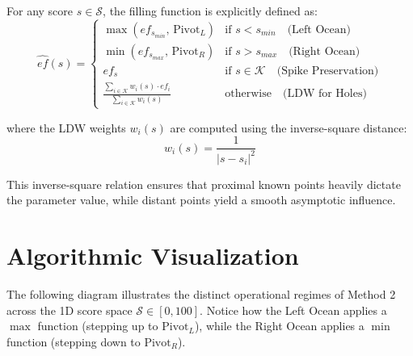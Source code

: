 \documentclass[11pt,a4paper]{article}
\begin{document}
For any score $s \in \mathcal{S}$, the filling function is explicitly defined as:
\begin{equation}
\hat{ef}(s) = 
\begin{cases} 
\max\left( ef_{s_{min}}, \, \text{Pivot}_L \right) & \text{if } s < s_{min} \quad \text{(Left Ocean)} \\[8pt]
\min\left( ef_{s_{max}}, \, \text{Pivot}_R \right) & \text{if } s > s_{max} \quad \text{(Right Ocean)} \\[8pt]
ef_s & \text{if } s \in \mathcal{K} \quad \text{(Spike Preservation)} \\[8pt]
\displaystyle \frac{\sum_{i \in \mathcal{K}} w_i(s) \cdot ef_i}{\sum_{i \in \mathcal{K}} w_i(s)} & \text{otherwise} \quad \text{(LDW for Holes)}
\end{cases}
\end{equation}

where the LDW weights $w_i(s)$ are computed using the inverse-square distance:
\begin{equation}
w_i(s) = \frac{1}{|s - s_i|^2}
\end{equation}

This inverse-square relation ensures that proximal known points heavily dictate the parameter value, while distant points yield a smooth asymptotic influence.

\section{Algorithmic Visualization}

The following diagram illustrates the distinct operational regimes of Method 2 across the 1D score space $\mathcal{S} \in [0, 100]$. Notice how the Left Ocean applies a $\max$ function (stepping up to $\text{Pivot}_L$), while the Right Ocean applies a $\min$ function (stepping down to $\text{Pivot}_R$).
\end{document}
